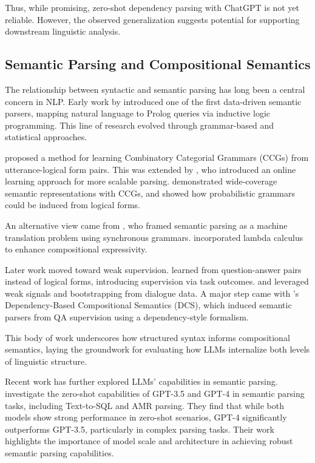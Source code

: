 Thus, while promising, zero-shot dependency parsing with ChatGPT is not yet reliable. However, the observed generalization suggests potential for supporting downstream linguistic analysis.

\subsection{Semantic Parsing and Compositional Semantics}

The relationship between syntactic and semantic parsing has long been a central concern in NLP. Early work by \citet{zelle1996} introduced one of the first data-driven semantic parsers, mapping natural language to Prolog queries via inductive logic programming. This line of research evolved through grammar-based and statistical approaches.

\citet{zettlemoyer2005} proposed a method for learning Combinatory Categorial Grammars (CCGs) from utterance-logical form pairs. This was extended by \citet{zettlemoyer2007online}, who introduced an online learning approach for more scalable parsing. \citet{bos2004} demonstrated wide-coverage semantic representations with CCGs, and \citet{kwiatkowski2010} showed how probabilistic grammars could be induced from logical forms.

An alternative view came from \citet{wong2006learning}, who framed semantic parsing as a machine translation problem using synchronous grammars. \citet{wong2007} incorporated lambda calculus to enhance compositional expressivity.

Later work moved toward weak supervision. \citet{clarke2010} learned from question-answer pairs instead of logical forms, introducing supervision via task outcomes. \citet{goldwasser2011confidence} and \citet{artzi2011} leveraged weak signals and bootstrapping from dialogue data. A major step came with \citet{liang2013learning}'s Dependency-Based Compositional Semantics (DCS), which induced semantic parsers from QA supervision using a dependency-style formalism.

This body of work underscores how structured syntax informs compositional semantics, laying the groundwork for evaluating how LLMs internalize both levels of linguistic structure.

Recent work has further explored LLMs' capabilities in semantic parsing. \citet{liu2023llm} investigate the zero-shot capabilities of GPT-3.5 and GPT-4 in semantic parsing tasks, including Text-to-SQL and AMR parsing. They find that while both models show strong performance in zero-shot scenarios, GPT-4 significantly outperforms GPT-3.5, particularly in complex parsing tasks. Their work highlights the importance of model scale and architecture in achieving robust semantic parsing capabilities.

